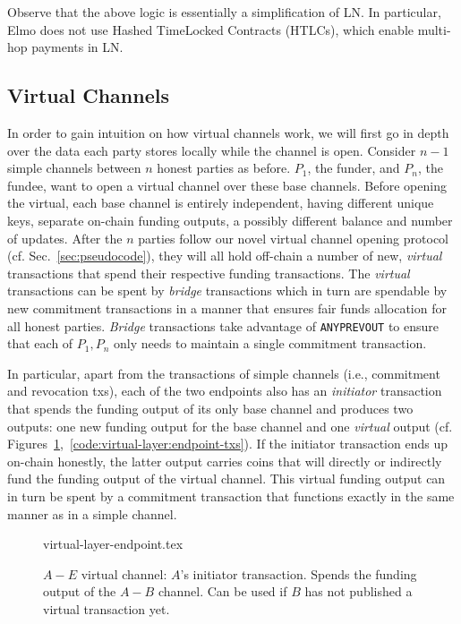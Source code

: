   Observe that the above logic is essentially a simplification of LN. In
  particular, Elmo does not use Hashed TimeLocked Contracts (HTLCs), which
  enable multi-hop payments in LN.

\subsection{Virtual Channels}
  \label{subsec:description-virtual-channels}
  In order to gain intuition on how virtual channels work, we will first
  go in depth over the data each party stores locally while the channel is open.
  Consider $n-1$
  simple channels between $n$ honest parties as before. $P_1$, the
  funder, and $P_n$, the fundee, want to open a virtual channel over these base
  channels.
  Before opening the virtual, each base channel is entirely independent, having
  different unique keys, separate on-chain funding outputs, a possibly different
  balance and number of updates. After the $n$ parties follow our novel virtual
  channel opening protocol (cf. Sec.~\ref{sec:pseudocode}), they will all
  hold off-chain a number of new,
  \emph{virtual} transactions that spend their respective funding transactions. The
  \emph{virtual} transactions can be spent by \emph{bridge} transactions which in turn
  are spendable by new commitment transactions in a manner that ensures fair
  funds allocation for all honest parties. \emph{Bridge} transactions take
  advantage of \texttt{ANYPREVOUT} to ensure that each of $P_1, P_n$ only needs
  to maintain a single commitment transaction.

  In particular, apart from the transactions of simple channels (i.e.,
  commitment and revocation txs), each of the two
  endpoints also has an \emph{initiator} transaction that spends the funding output
  of its only base channel and produces two outputs: one new funding output for
  the base channel and one \emph{virtual} output (cf.
  Figures~\ref{figure:virtual-layer-endpoint},~\ref{code:virtual-layer:endpoint-txs}).
  If the initiator transaction ends up on-chain honestly, the latter output
  carries coins that will directly or indirectly fund the funding output of the
  virtual channel. This virtual funding output can in turn be spent by a
  commitment transaction that functions exactly in the same manner as in a
  simple channel.

  \begin{figure}
    {virtual-layer-endpoint.tex}
    \caption{$A-E$ virtual channel: $A$'s initiator transaction. Spends the
    funding output of the $A-B$ channel. Can be used if $B$ has not published
    a virtual transaction yet.}
    \label{figure:virtual-layer-endpoint}
  \end{figure}


